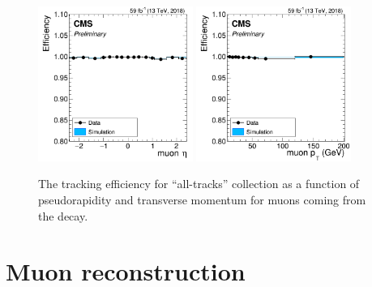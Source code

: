 \begin{figure}[!htpb]
  \includegraphics[width=0.45\textwidth]{plots/chapter5/TrackEta2018.png}
  \includegraphics[width=0.45\textwidth]{plots/chapter5/TrackPt2018.png} \\
  \caption{The tracking efficiency for ``all-tracks'' collection as a function of pseudorapidity and transverse momentum for muons coming from the \PZ decay.}
  \label{fig:trackeff}
\end{figure}


\section{Muon reconstruction}

